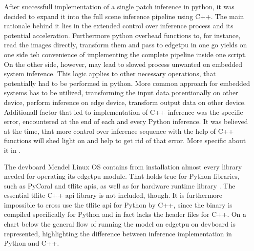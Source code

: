{After successfull implementation of a single patch inference in python, it was decided to expand it into the full scene inference pipeline using C++.
The main rationale behind it lies in the extended control over inference process and its potential acceleration.
Furthermore python overhead functions to, for instance, read the  images directly,
transform them and pass to \gls{edgetpu} in one go yields on one side teh convenience of implementing the complete pipeline inside one script.
On the other side, however, may lead to slowed process unwanted on embedded system inference. This logic applies to other necessary operations,
that potentially had to be performed in python. More common approach for embedded systems has to be utilized, transforming the input data
potentionally on other device, perform inference on edge device, transform output data on other device.
Additionall factor that led to implementation of C++ inference was the specific error,
encountered at the end of each and every Python inference. It was believed at the time,
that more control over inference sequence with the help of C++ functions will shed light on and help to get rid of that error.
More specific about it in .

The \gls{devboard} Mendel Linux OS contains from installation almost every library needed for operating its \gls{edgetpu} module.
That holds true for Python libraries, such as PyCoral and \gls{tflite} \glspl{api}, as well as for hardware runtime library .
The essential \gls{tflite} C++ \gls{api} library is not included, though.
It is furthermore impossible to cross use the \gls{tflite} \gls{api} for Python by C++,
since the binary is compiled specifically for Python and in fact lacks the header files for C++.
On a chart below the general flow of running the model on \gls{edgetpu} on \gls{devboard} is represented,
highlighting the difference between inference implementation in Python and C++.

\begin{figure}[H]
\centering
{}
\end{figure}}
